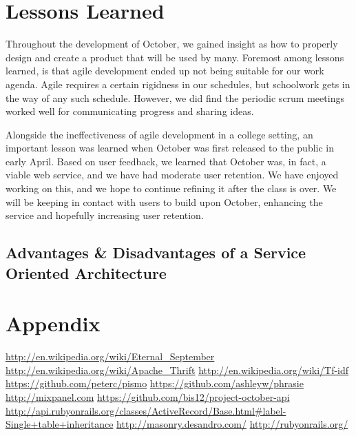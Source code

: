 \documentclass[11pt,letterpaper]{article}
\begin{document}
\section{Lessons Learned}
Throughout the development of October, we gained insight as how to properly design and create a product that will be used by many.
Foremost among lessons learned, is that agile development ended up not being suitable for our work agenda.
Agile requires a certain rigidness in our schedules, but schoolwork gets in the way of any such schedule.
However, we did find the periodic scrum meetings worked well for communicating progress and sharing ideas.

Alongside the ineffectiveness of agile development in a college setting, an important lesson was learned when October was first released to the public in early April.
Based on user feedback, we learned that October was, in fact, a viable web service, and we have had moderate user retention.
We have enjoyed working on this, and we hope to continue refining it after the class is over.
We will be keeping in contact with users to build upon October, enhancing the service and hopefully increasing user retention.

\subsection{Advantages \& Disadvantages of a Service Oriented Architecture}

\section{Appendix}

\newpage
\newpage
\begin{thebibliography}{6}
   \url{http://en.wikipedia.org/wiki/Eternal\_September}
   \url{http://en.wikipedia.org/wiki/Apache\_Thrift}
   \url{http://en.wikipedia.org/wiki/Tf-idf}
   \url{https://github.com/peterc/pismo}
   \url{https://github.com/ashleyw/phrasie}
   \url{http://mixpanel.com}
   \url{https://github.com/bis12/project-october-api}
   \url{http://api.rubyonrails.org/classes/ActiveRecord/Base.html#label-Single+table+inheritance}
   \url{http://masonry.desandro.com/}
   \url{http://rubyonrails.org/}
\end{thebibliography}
\end{document}
